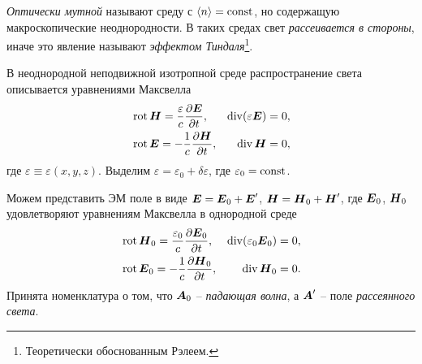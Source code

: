 \begin{to_def}
    \textit{Оптически мутной} называют среду с $\langle n\rangle = \text{const}$, но содержащую макроскопические неоднородности. В таких средах свет \textit{рассеивается в стороны}, иначе это явление называют \textit{эффектом Тиндаля}\footnote{
        Теоретически обоснованным Рэлеем.
    }.
\end{to_def}

В неоднородной неподвижной изотропной среде распространение света описывается уравнениями Максвелла
\begin{align*}
    &\mathop{\mathrm{rot}}\nolimits \mbox{\boldmath $H$} = \frac{\varepsilon}{c} \frac{\partial \mbox{\boldmath $E$}}{\partial t}, &\mathop{\mathrm{div}}\nolimits(\varepsilon \mbox{\boldmath $E$}) = 0, \\
    &\mathop{\mathrm{rot}}\nolimits \mbox{\boldmath $E$} = - \frac{1}{c} \frac{\partial \mbox{\boldmath $H$}}{\partial t}, &\mathop{\mathrm{div}}\nolimits \mbox{\boldmath $H$} = 0,
\end{align*}
где $\varepsilon \equiv \varepsilon(x, y, z)$. Выделим $\varepsilon = \varepsilon_0 + \delta \varepsilon$, где $\varepsilon_0 = \text{const}$. 


Можем представить ЭМ поле в виде $\mbox{\boldmath $E$} = \mbox{\boldmath $E$}_0 + \mbox{\boldmath $E$}'$, $\mbox{\boldmath $H$} = \mbox{\boldmath $H$}_0 + \mbox{\boldmath $H$}'$, где $\mbox{\boldmath $E$}_0$, $\mbox{\boldmath $H$}_0$ удовлетворяют уравнениям Максвелла в однородной среде
\begin{align*}
    &\mathop{\mathrm{rot}}\nolimits \mbox{\boldmath $H$}_0 = \frac{\varepsilon_0}{c} \frac{\partial \mbox{\boldmath $E$}_0}{\partial t}, &\mathop{\mathrm{div}}\nolimits(\varepsilon_0 \mbox{\boldmath $E$}_0) = 0, \\
    &\mathop{\mathrm{rot}}\nolimits \mbox{\boldmath $E$}_0 = - \frac{1}{c} \frac{\partial \mbox{\boldmath $H$}_0}{\partial t}, &\mathop{\mathrm{div}}\nolimits \mbox{\boldmath $H$}_0 = 0.
\end{align*}
Принята номенклатура о том, что $\mbox{\boldmath $A$}_0$ -- \textit{падающая волна}, а $\mbox{\boldmath $A$}'$ -- поле \textit{рассеянного света}. 

